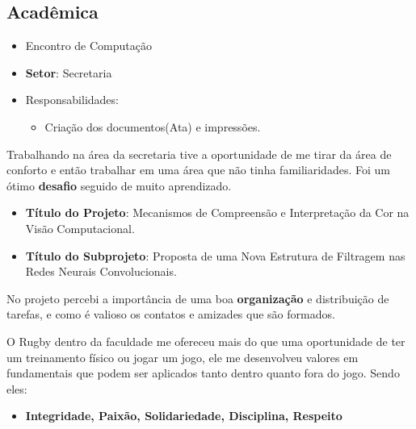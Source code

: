 \documentclass[10pt, a4paper, roman]{moderncv} %
\begin{document}
\vspace{0.5cm}

\subsection{Acadêmica}


\vspace{0.2cm}
{
	\begin{itemize}
		\item Encontro de Computação
		\item \textbf{Setor}: Secretaria
    \item Responsabilidades:
    \begin{itemize}
      \item Criação dos documentos(Ata) e impressões.
    \end{itemize}
	\end{itemize}
  Trabalhando na área da secretaria tive a oportunidade de me tirar da área de conforto e então trabalhar em uma área que não tinha familiaridades. Foi um ótimo \textbf{desafio} seguido de muito aprendizado.
}


\vspace{0.2cm}
{
	\begin{itemize}
		\item \textbf{Título do Projeto}: Mecanismos de Compreensão e Interpretação da Cor na Visão Computacional.
		\item \textbf{Título do Subprojeto}: Proposta de uma Nova Estrutura de Filtragem nas Redes Neurais Convolucionais.
	\end{itemize}
  No projeto percebi a importância de uma boa \textbf{organização} e distribuição de tarefas, e como é valioso os contatos e amizades que são formados.
}


\vspace{0.2cm}
{
O Rugby dentro da faculdade me ofereceu mais do que uma oportunidade de ter um treinamento físico ou jogar um jogo, ele me desenvolveu valores em fundamentais que podem ser aplicados tanto dentro quanto fora do jogo. Sendo eles:
\begin{itemize}
  \item \textbf{Integridade, Paixão, Solidariedade, Disciplina, Respeito}
\end{itemize}
}
\end{document}
